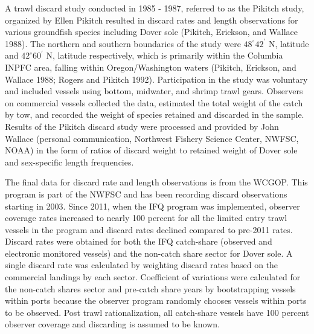 \documentclass[11pt,
  english,
  a4paper,
]{article}
\begin{document}
\leavevmode\tagmcend\tagstructend\par


A trawl discard study conducted in 1985 - 1987, referred to as the Pikitch study, organized by Ellen Pikitch resulted in discard rates and length observations for various groundfish species including Dover sole {(Pikitch, Erickson, and Wallace 1988)\leavevmode\tagmcend\tagstructend}. The northern and southern boundaries of the study were {\(48^\circ 42^\prime\)\leavevmode\tagmcend\tagstructend} N, latitude and {\(42^\circ 60^\prime\)\leavevmode\tagmcend\tagstructend} N, latitude respectively, which is primarily within the Columbia INPFC area, falling within Oregon/Washington waters {(Pikitch, Erickson, and Wallace 1988; Rogers and Pikitch 1992)\leavevmode\tagmcend\tagstructend}. Participation in the study was voluntary and included vessels using bottom, midwater, and shrimp trawl gears. Observers on commercial vessels collected the data, estimated the total weight of the catch by tow, and recorded the weight of species retained and discarded in the sample. Results of the Pikitch discard study were processed and provided by John Wallace (personal communication, Northwest Fishery Science Center, NWFSC, NOAA) in the form of ratios of discard weight to retained weight of Dover sole and sex-specific length frequencies.

\leavevmode\tagmcend\tagstructend\par


The final data for discard rate and length observations is from the WCGOP. This program is part of the NWFSC and has been recording discard observations starting in 2003. Since 2011, when the IFQ program was implemented, observer coverage rates increased to nearly 100 percent for all the limited entry trawl vessels in the program and discard rates declined compared to pre-2011 rates. Discard rates were obtained for both the IFQ catch-share (observed and electronic monitored vessels) and the non-catch share sector for Dover sole. A single discard rate was calculated by weighting discard rates based on the commercial landings by each sector. Coefficient of variations were calculated for the non-catch shares sector and pre-catch share years by bootstrapping vessels within ports because the observer program randomly chooses vessels within ports to be observed. Post trawl rationalization, all catch-share vessels have 100 percent observer coverage and discarding is assumed to be known.
\end{document}
